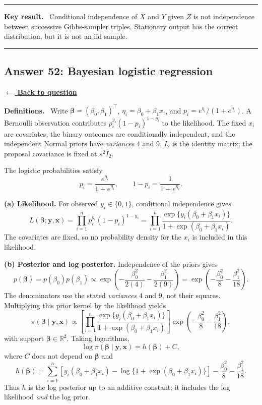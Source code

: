 \documentclass[11pt,a4paper]{article}
\newcommand{\given}{\mathrel{|}}
\newcommand{\xvec}{\boldsymbol{x}}
\newcommand{\answernav}[1]{%
  \label{answer:#1}%
  \noindent\hyperref[question:#1]{$\leftarrow$ \textbf{Back to question}}%
  \par\smallskip}
\newcommand{\studyheading}[1]{%
  \par\medskip\noindent\textcolor{statblue}{\textbf{#1.}}\ }
\newenvironment{keyresult}
  {\begin{center}\begin{minipage}{0.92\linewidth}\color{statblue}%
   \hrule\vspace{6pt}\textbf{Key result.}\ }
  {\vspace{6pt}\hrule\end{minipage}\end{center}}
\begin{document}
\begin{keyresult}
Conditional independence of $X$ and $Y$ given $Z$ is not independence
between successive Gibbs-sampler triples. Stationary output has the
correct distribution, but it is not an iid sample.
\end{keyresult}

\clearpage

\subsection{Answer 52: Bayesian logistic regression}
\answernav{52}

\studyheading{Definitions}
Write $\boldsymbol\beta=(\beta_0,\beta_1)^\top$,
$\eta_i=\beta_0+\beta_1x_i$, and $p_i=e^{\eta_i}/(1+e^{\eta_i})$.
A Bernoulli observation contributes $p_i^{y_i}(1-p_i)^{1-y_i}$ to the likelihood.
The fixed $x_i$ are covariates, the binary outcomes are conditionally independent, and the independent Normal priors have \emph{variances} 4 and 9.
$I_2$ is the identity matrix; the proposal covariance is fixed at $s^2I_2$.

The logistic probabilities satisfy
\[
p_i=\frac{e^{\eta_i}}{1+e^{\eta_i}},\qquad
1-p_i=\frac1{1+e^{\eta_i}}.
\]

\textbf{(a) Likelihood.}
For observed $y_i\in\{0,1\}$, conditional independence gives
\[
\boxed{
L(\boldsymbol\beta;\mathbf y,\xvec)
=\prod_{i=1}^n p_i^{y_i}(1-p_i)^{1-y_i}
=\prod_{i=1}^n\frac{\exp\{y_i(\beta_0+\beta_1x_i)\}}
                          {1+\exp(\beta_0+\beta_1x_i)}.
}
\]
The covariates are fixed, so no probability density for the $x_i$ is
included in this likelihood.

\textbf{(b) Posterior and log posterior.}
Independence of the priors gives
\[
p(\boldsymbol\beta)=p(\beta_0)p(\beta_1)
\propto\exp\left(-\frac{\beta_0^2}{2(4)}
                 -\frac{\beta_1^2}{2(9)}\right)
=\exp\left(-\frac{\beta_0^2}{8}-\frac{\beta_1^2}{18}\right).
\]
The denominators use the stated \emph{variances} $4$ and $9$, not their
squares. Multiplying this prior kernel by the likelihood yields
\[
\boxed{
\pi(\boldsymbol\beta\given\mathbf y,\xvec)
\propto
\left[\prod_{i=1}^n
\frac{\exp\{y_i(\beta_0+\beta_1x_i)\}}
     {1+\exp(\beta_0+\beta_1x_i)}\right]
\exp\left(-\frac{\beta_0^2}{8}-\frac{\beta_1^2}{18}\right),
}
\]
with support $\boldsymbol\beta\in\mathbb R^2$. Taking logarithms,
\[
\log\pi(\boldsymbol\beta\given\mathbf y,\xvec)
=h(\boldsymbol\beta)+C,
\]
where $C$ does not depend on $\boldsymbol\beta$ and
\[
\boxed{
h(\boldsymbol\beta)
=\sum_{i=1}^n\left[
y_i(\beta_0+\beta_1x_i)
-\log\{1+\exp(\beta_0+\beta_1x_i)\}\right]
-\frac{\beta_0^2}{8}-\frac{\beta_1^2}{18}.
}
\]
Thus $h$ is the log posterior up to an additive constant; it includes
the log likelihood \emph{and} the log prior.
\end{document}
